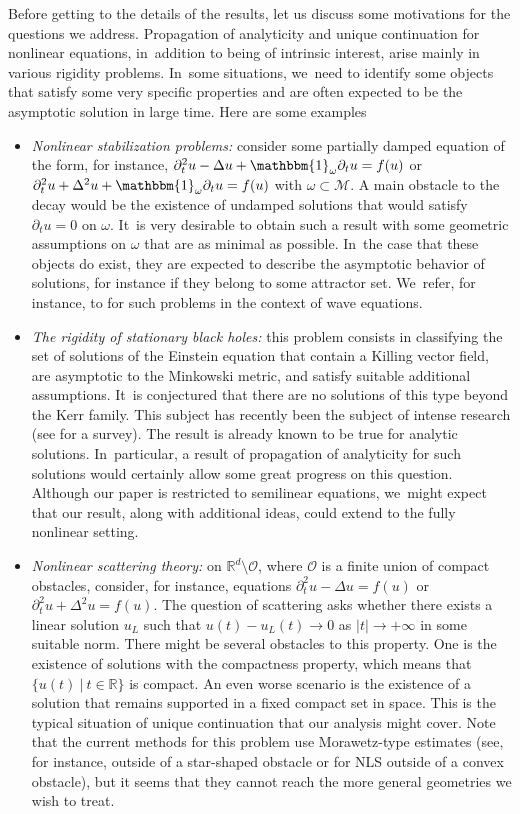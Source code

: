 \documentclass[JEP,XML,SOM,Unicode,published]{cedram}
\theoremstyle{definition}
\let\mc\mathcal
\newcommand{\M}{\mc{M}}
\newcommand{\R}{\mathbb{R}}
\begin{document}
Before getting to the details of the results, let us discuss some motivations for the questions we address. Propagation of analyticity and unique continuation for nonlinear equations, in~addition to being of intrinsic interest, arise mainly in various rigidity problems. In~some situations, we~need to identify some objects that satisfy some very specific properties and are often expected to be the asymptotic solution in large time. Here are some examples
\begin{itemize}
\item \emph{Nonlinear stabilization problems:} consider some partially damped equation of the form, for instance, $\partial_t^2u-\Delta u+\mathbbm{1}_{\omega}\partial_t u=f(u)$ or $\partial_t^2u+\Delta^2 u+\mathbbm{1}_{\omega}\partial_t u=f(u)$ with $\omega \subset \M$. A main obstacle to the decay would be the existence of undamped solutions that would satisfy $\partial_t u=0$ on $\omega$. It~is very desirable to obtain such a result with some geometric assumptions on $\omega$ that are as minimal as possible. In~the case that these objects do exist, they are expected to describe the asymptotic behavior of solutions, for instance if they belong to some attractor set. We~refer, for instance, to \cite{Z:91,DLZ03,JL13,L:11} for such problems in the context of wave equations.
\item \emph{The rigidity of stationary black holes:} this problem consists in classifying the set of solutions of the Einstein equation that contain a Killing vector field, are asymptotic to the Minkowski metric, and satisfy suitable additional assumptions. It~is conjectured that there are no solutions of this type beyond the Kerr family. This subject has recently been the subject of intense research (see \cite{IK:15} for a survey). The result is already known to be true for analytic solutions. In~particular, a result of propagation of analyticity for such solutions would certainly allow some great progress on this question. Although our paper is restricted to semilinear equations, we~might expect that our result, along with additional ideas, could extend to the fully nonlinear setting.
\item \emph{Nonlinear scattering theory:} on $\R^d\setminus \mathcal{O}$, where $\mathcal{O}$ is a finite union of compact obstacles, consider, for instance, equations $\partial_t^2u-\Delta u=f(u)$ or $\partial_t^2u+\Delta^2 u=f(u)$. The question of scattering asks whether there exists a linear solution $u_L$ such that $u(t)-u_L(t)\to 0$ as $|t|\to+\infty$ in some suitable norm. There might be several obstacles to this property. One is the existence of solutions with the compactness property, which means that $\{u(t)\ |\ t\in\R\}$ is compact. An even worse scenario is the existence of a solution that remains supported in a fixed compact set in space. This is the typical situation of unique continuation that our analysis might cover. Note that the current methods for this problem use Morawetz-type estimates (see, for instance, \cite{BSS:09} outside of a star-shaped obstacle or \cite{KVZ:16} for NLS outside of a convex obstacle), but it seems that they cannot reach the more general geometries we wish to treat.
\end{itemize}
\end{document}
